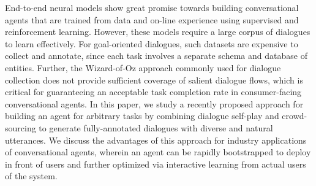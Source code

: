 End-to-end neural models show great promise towards building conversational agents that are trained from data and on-line experience using supervised and reinforcement learning. However, these models require a large corpus of dialogues to learn effectively. For goal-oriented dialogues, such datasets are expensive to collect and annotate, since each task involves a separate schema and database of entities. Further, the Wizard-of-Oz approach commonly used for dialogue collection does not provide sufficient coverage of salient dialogue flows, which is critical for guaranteeing an acceptable task completion rate in consumer-facing conversational agents. In this paper, we study a recently proposed approach for building an agent for arbitrary tasks by combining dialogue self-play and crowd-sourcing to generate fully-annotated dialogues with diverse and natural utterances. We discuss the advantages of this approach for industry applications of conversational agents, wherein an agent can be rapidly bootstrapped to deploy in front of users and further optimized via interactive learning from actual users of the system.
